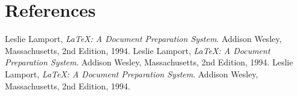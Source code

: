 \documentclass[a4paper,12pt,notitlepage]{article}
\begin{document}
\section{References}
\begin{thebibliography}{9}


  Leslie Lamport,
  \emph{\LaTeX: A Document Preparation System}.
  Addison Wesley, Massachusetts,
  2nd Edition,
  1994.
  Leslie Lamport,
  \emph{\LaTeX: A Document Preparation System}.
  Addison Wesley, Massachusetts,
  2nd Edition,
  1994.
  Leslie Lamport,
  \emph{\LaTeX: A Document Preparation System}.
  Addison Wesley, Massachusetts,
  2nd Edition,
  1994.
\end{thebibliography}
\end{document}
